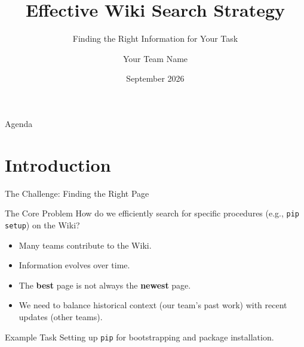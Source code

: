 \documentclass{beamer}
\title{Effective Wiki Search Strategy}
\subtitle{Finding the Right Information for Your Task}
\author{Your Team Name}
\date{September 2026}
\begin{document}
	
	\begin{frame}
		\titlepage
	\end{frame}
	
	\begin{frame}{Agenda}
		\tableofcontents
	\end{frame}
	
	\section{Introduction}
	\begin{frame}{The Challenge: Finding the Right Page}
		\begin{block}{The Core Problem}
			How do we efficiently search for specific procedures (e.g., \texttt{pip setup}) on the Wiki?
		\end{block}
		\begin{itemize}
			\item Many teams contribute to the Wiki.
			\item Information evolves over time.
			\item The \textbf{best} page is not always the \textbf{newest} page.
			\item We need to balance historical context (our team's past work) with recent updates (other teams).
		\end{itemize}
		\begin{alertblock}{Example Task}
			Setting up \texttt{pip} for bootstrapping and package installation.
		\end{alertblock}
	\end{frame}
	
\end{document}
